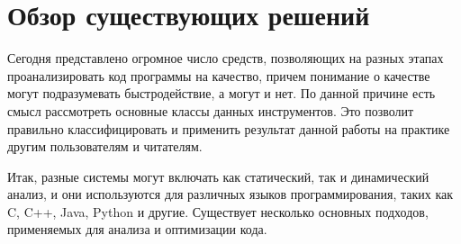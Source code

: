 \documentclass{mipt-thesis-bs}
\begin{document}
\chapter{Обзор существующих решений}
Сегодня представлено огромное число средств, позволяющих на разных этапах проанализировать код программы на качество,
причем понимание о качестве могут подразумевать быстродействие, а могут и нет. По данной причине есть смысл
рассмотреть основные классы данных инструментов. Это позволит правильно классифицировать и применить результат данной
работы на практике другим пользователям и читателям.

Итак, разные системы могут включать как статический, так и динамический анализ, и они
используются для различных языков программирования, таких как C, C++, Java, Python и другие.
Существует несколько основных подходов, применяемых для анализа и оптимизации кода.
\end{document}
